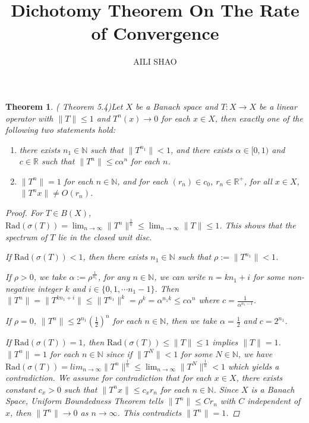 \documentclass[11pt, a4paper]{amsart}
\newtheorem{theorem}{Theorem}
\begin{document}
\title{Dichotomy Theorem On The Rate of Convergence}
\author{AILI SHAO}
\maketitle
\hrulefill
\hrulefill
\hrulefill



\begin{theorem}(\cite{DH15} Theorem 5.4)\label{theorem}
Let $X$ be a Banach space and $T\colon X\to X$ be a linear operator with $\|T\|\leq 1$ and $T^n(x)\rightarrow 0$ for each $x\in X$, then exactly one of the following two statements hold:
\begin{enumerate}
\item there exists $n_1\in\mathbb{N}$ such that $\|T^{n_1}\|<1$, and there exists $\alpha\in [0,1)$ and $c\in \mathbb{R}$ such that $\|T^n\|\leq c\alpha^n$ for each $n$.\\
\item $\|T^n\|=1$ for each $n\in\mathbb{N}$, and for each $(r_n)\in c_0$, $r_n\in\mathbb{R}^{+}$, for all $x\in X$, $\|T^n x\|\neq O(r_n)$.
\end{enumerate}
\begin{proof}
For $T\in B(X)$, $\mathrm{Rad}(\sigma(T))=\lim_{n\rightarrow\infty}\|T^n\|^{\frac{1}{n}}\leq \lim_{n\rightarrow\infty}\|T\|\leq 1$. This shows that the spectrum of $T$ lie in the closed unit disc. 

If $\mathrm{Rad}(\sigma(T))<1$, then there exists $n_1\in\mathbb{N}$ such that $\rho:=\|T^{n_1}\|<1$.
 
If $\rho>0$, we take $\alpha:=\rho^{\frac{1}{n_1}}$, for any $n\in\mathbb{N}$, we can write $n=kn_1+i$ for some non-negative integer $k$ and $i\in\{0,1,\cdots n_{1}-1\}$. Then $\|T^n\|=\|T^{kn_1+i}\|\leq \|T^{n_1}\|^k=\rho^k=\alpha^{n_1k}\leq c\alpha^n$ where $c= \frac{1}{\alpha^{n_1-1}}$.

If $\rho=0$, $\|T^n\|\leq 2^{n_1}(\frac{1}{2})^n$ for each $n\in\mathbb{N}$, then we take $\alpha=\frac{1}{2}$ and $c=2^{n_1}$.
\par
If $\mathrm{Rad}(\sigma(T))=1$, then $\mathrm{Rad}(\sigma(T))\leq\|T\|\leq 1$ implies $\|T\|=1$. $\|T^n\|=1$ for each $n\in\mathbb{N}$ since if $\|T^N\|<1$ for some $N\in\mathbb{N}$, we have $\mathrm{Rad}(\sigma(T))=lim_{n\rightarrow \infty}\|T^n\|^{\frac{1}{n}}\leq\lim_{n\rightarrow \infty}\|T^N\|^{\frac{1}{n}}<1$ which yields a contradiction. We assume for contradiction that for each $x\in X$, there exists constant $c_x>0$ such that $\|T^n x\|\leq c_x r_n$ for each $n\in\mathbb{N}$. Since $X$ is a Banach Space, \emph{Uniform Boundedness Theorem} tells $\|T^n\|\leq C r_n$ with $C$ independent of $x$, then $\|T^n\|\rightarrow 0$ as $n\rightarrow \infty$. This contradicts $\|T^n\|=1$. 
\end{proof}
\end{theorem}
\end{document}
